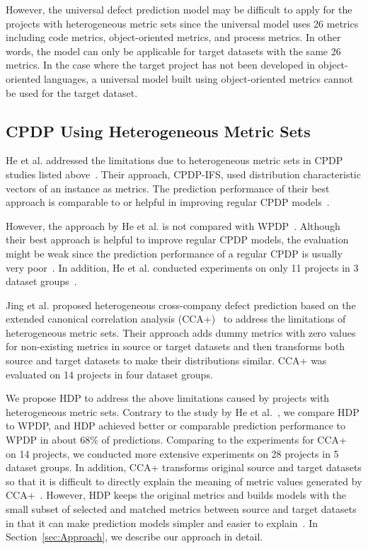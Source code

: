 However, the universal defect prediction model may be difficult to apply for the
projects with heterogeneous metric sets since the universal
model uses 26 metrics including code metrics, object-oriented metrics, and
process metrics. In other words, the model can only be applicable for
target datasets with the same 26 metrics. In the case where the target project
has not been developed in object-oriented languages, a universal model built
using object-oriented metrics cannot be used for the target dataset.

\subsection{CPDP Using Heterogeneous Metric Sets}
He et al. addressed the limitations due to
heterogeneous metric sets in CPDP studies listed
above~\cite{He14}.
Their approach, CPDP-IFS, used distribution
characteristic vectors of an instance as metrics.
The prediction performance of their best approach is comparable to or
helpful in improving regular CPDP models~\cite{He14}.

However, the approach by He et al. is not compared with WPDP~\cite{He14}.
Although their best approach is helpful to improve regular CPDP models, the
evaluation might be weak since the prediction performance of a regular CPDP is
usually very poor~\cite{Zimmermann09}. In addition, He et al. conducted
experiments on only 11 projects in 3 dataset groups~\cite{He14}.

Jing et al. proposed heterogeneous cross-company defect prediction based on the extended canonical correlation analysis (CCA+)~\cite{Jing15} to address the limitations of heterogeneous metric sets. Their approach adds dummy metrics with zero values for non-existing metrics in source or target datasets and then transforms both source and target datasets to make their distributions similar. CCA+ was evaluated on 14 projects in four dataset groups.

We propose HDP to address the above
limitations caused by projects with heterogeneous metric sets.
Contrary to the study by He et al.~\cite{He14}, we compare HDP to
WPDP, and HDP achieved better or comparable prediction performance to WPDP in
about 68\% of predictions.
Comparing to the experiments for CCA+~\cite{Jing15} on 14 projects, we conducted more extensive experiments on 28 projects in 5 dataset groups. In addition, CCA+ transforms original source and target datasets so that it is difficult to directly explain the meaning of metric values generated by CCA+~\cite{Jing15}. However, HDP keeps the original metrics and builds models with the small subset of selected and matched metrics between source and target datasets in that it can make prediction models simpler and easier to explain~\cite{Nam15HDP,Shihab14}. In
Section~\ref{sec:Approach}, we describe our approach in detail.

